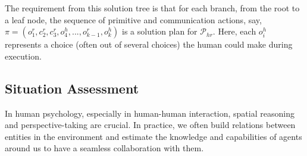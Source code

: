 \documentclass[letterpaper]{article} %
\begin{document}
The requirement from this solution tree is that for each branch, from the root to a leaf node, the sequence of primitive and communication actions, say, $\pi=(o^r_1, c^r_2, c^r_3, o^h_4,...,o^r_{k-1},o^h_k)$ is a solution plan for $\mathcal{P}_{hr}$. Here, each $o_i^h$ represents a choice (often out of several choices) the human could make during execution.



\subsection{Situation Assessment} In human psychology, especially in human-human interaction, spatial reasoning and perspective-taking are crucial. 
In practice, we often build relations between 
entities in the environment and estimate the knowledge and capabilities of agents around us to have a seamless collaboration with them.

\end{document}
